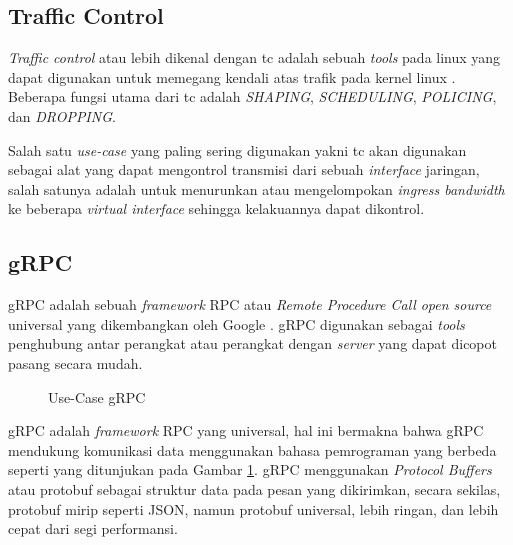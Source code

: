     
    \subsection{Traffic Control}
    \textit{Traffic control} atau lebih dikenal dengan tc adalah sebuah \textit{tools} pada linux yang dapat digunakan untuk memegang kendali atas trafik pada kernel linux \citep{tc}.
    Beberapa fungsi utama dari tc adalah \textit{SHAPING}, \textit{SCHEDULING}, \textit{POLICING}, dan \textit{DROPPING}.

    Salah satu \textit{use-case} yang paling sering digunakan yakni tc akan digunakan sebagai alat yang dapat mengontrol transmisi dari sebuah \textit{interface} jaringan,
    salah satunya adalah untuk menurunkan atau mengelompokan  \textit{ingress bandwidth} ke beberapa \textit{virtual interface} sehingga kelakuannya dapat dikontrol.

    \subsection{gRPC}
    gRPC adalah sebuah \textit{framework} RPC atau \textit{Remote Procedure Call} \textit{open source} universal yang dikembangkan oleh Google \citep{grpc}.
    gRPC digunakan sebagai \textit{tools} penghubung antar perangkat atau perangkat dengan \textit{server} yang dapat dicopot pasang secara mudah.
    \begin{figure}[tbh]
        \centering
        
        \caption{Use-Case gRPC \citep{grpc}}\label{fig:gRPC}
    \end{figure}

    gRPC adalah \textit{framework} RPC yang universal, hal ini bermakna bahwa gRPC mendukung komunikasi data menggunakan bahasa pemrograman yang berbeda
    seperti yang ditunjukan pada Gambar \ref{fig:gRPC}. gRPC menggunakan \textit{Protocol Buffers} atau protobuf sebagai struktur data pada pesan yang dikirimkan,
    secara sekilas, protobuf mirip seperti JSON, namun protobuf universal, lebih ringan, dan lebih cepat dari segi performansi.

